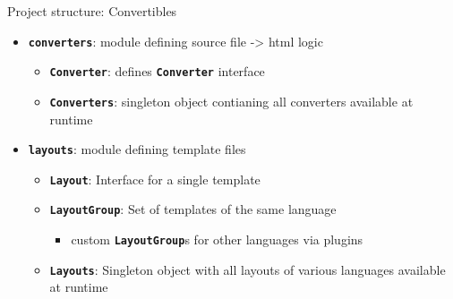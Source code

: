 \documentclass[compress, aspectratio=169]{beamer}
\renewcommand{\imp}[1]{\texttt{\textbf{#1}}}
\begin{document}
\begin{frame}[fragile]{Project structure: Convertibles}
    \begin{itemize}[<+->]
        \item \imp{converters}: module defining source file -> html logic 
            \begin{itemize}
                \item \imp{Converter}: defines \imp{Converter} interface
                \item \imp{Converters}: singleton object contianing all
                    converters available at runtime
            \end{itemize}
        \item \imp{layouts}: module defining template files
            \begin{itemize}
                \item \imp{Layout}: Interface for a single template
                \item \imp{LayoutGroup}: Set of templates of the same language
                    \begin{itemize}
                        \item custom \imp{LayoutGroup}s for other
                            languages via plugins
                    \end{itemize}
                \item \imp{Layouts}: Singleton object with all layouts of various
                    languages available at runtime
            \end{itemize}

    \end{itemize}
\end{frame}
\end{document}
